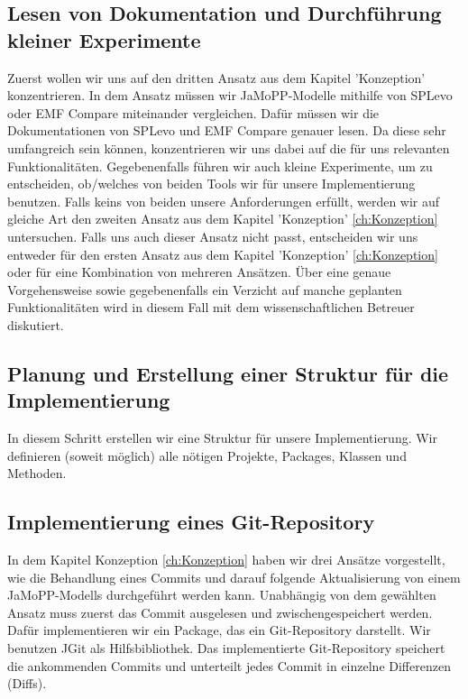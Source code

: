 \subsection{Lesen von Dokumentation und Durchführung kleiner Experimente}
Zuerst wollen wir uns auf den dritten Ansatz aus dem Kapitel 'Konzeption' konzentrieren. In dem Ansatz müssen wir JaMoPP-Modelle \cite{jamopp} mithilfe von SPLevo \cite{splevo}oder EMF Compare \cite{emfcompare} miteinander vergleichen. Dafür müssen wir die Dokumentationen von SPLevo und EMF Compare genauer lesen. Da diese sehr umfangreich sein können, konzentrieren wir uns dabei auf die für uns relevanten Funktionalitäten. Gegebenenfalls führen wir auch kleine Experimente, um zu entscheiden, ob/welches von beiden Tools wir für unsere Implementierung benutzen. Falls keins von beiden unsere Anforderungen erfüllt, werden wir auf gleiche Art den zweiten Ansatz aus dem Kapitel 'Konzeption' \ref{ch:Konzeption} untersuchen. Falls uns auch dieser Ansatz nicht passt, entscheiden wir uns entweder für den ersten Ansatz aus dem Kapitel 'Konzeption' \ref{ch:Konzeption} oder für eine Kombination von mehreren Ansätzen. Über eine genaue Vorgehensweise sowie gegebenenfalls ein Verzicht auf manche geplanten Funktionalitäten wird in diesem Fall mit dem wissenschaftlichen Betreuer diskutiert.

\subsection{Planung und Erstellung einer Struktur für die Implementierung}
In diesem Schritt erstellen wir eine Struktur für unsere Implementierung. Wir definieren (soweit möglich) alle nötigen Projekte, Packages, Klassen und Methoden.

\subsection{Implementierung eines Git-Repository}
In dem Kapitel Konzeption \ref{ch:Konzeption} haben wir drei Ansätze vorgestellt, wie die Behandlung eines Commits und darauf folgende Aktualisierung von einem JaMoPP-Modells durchgeführt werden kann. Unabhängig von dem gewählten Ansatz muss zuerst das Commit ausgelesen und zwischengespeichert werden. Dafür implementieren wir ein Package, das ein Git-Repository darstellt. Wir benutzen JGit \cite{jgit} als Hilfsbibliothek.  Das implementierte Git-Repository speichert die ankommenden Commits und unterteilt jedes Commit in einzelne Differenzen (Diffs).

